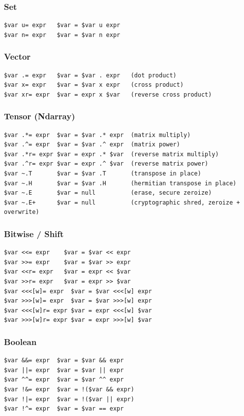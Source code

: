 \subsubsection{Set}
\begin{verbatim}
$var u= expr   $var = $var u expr
$var n= expr   $var = $var n expr
\end{verbatim}

\subsubsection{Vector}
\begin{verbatim}
$var .= expr   $var = $var . expr   (dot product)
$var x= expr   $var = $var x expr   (cross product)
$var xr= expr  $var = expr x $var   (reverse cross product)
\end{verbatim}

\subsubsection{Tensor (Ndarray)}
\begin{verbatim}
$var .*= expr  $var = $var .* expr  (matrix multiply)
$var .^= expr  $var = $var .^ expr  (matrix power)
$var .*r= expr $var = expr .* $var  (reverse matrix multiply)
$var .^r= expr $var = expr .^ $var  (reverse matrix power)
$var ~.T       $var = $var .T       (transpose in place)
$var ~.H       $var = $var .H       (hermitian transpose in place)
$var ~.E       $var = null          (erase, secure zeroize)
$var ~.E+      $var = null          (cryptographic shred, zeroize + overwrite)
\end{verbatim}

\subsubsection{Bitwise / Shift}
\begin{verbatim}
$var <<= expr    $var = $var << expr
$var >>= expr    $var = $var >> expr
$var <<r= expr   $var = expr << $var
$var >>r= expr   $var = expr >> $var
$var <<<[w]= expr  $var = $var <<<[w] expr
$var >>>[w]= expr  $var = $var >>>[w] expr
$var <<<[w]r= expr $var = expr <<<[w] $var
$var >>>[w]r= expr $var = expr >>>[w] $var
\end{verbatim}

\subsubsection{Boolean}
\begin{verbatim}
$var &&= expr  $var = $var && expr
$var ||= expr  $var = $var || expr
$var ^^= expr  $var = $var ^^ expr
$var !&= expr  $var = !($var && expr)
$var !|= expr  $var = !($var || expr)
$var !^= expr  $var = $var == expr
\end{verbatim}

